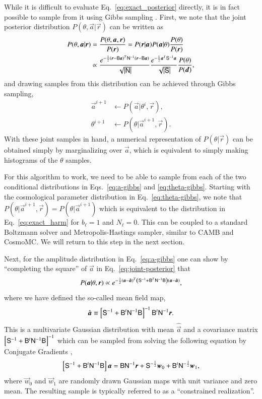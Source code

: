 \documentclass[twocolumn]{../common/aa}
\renewcommand{\d}[0]{\vec{d}}
\newcommand{\B}[0]{\tens{B}}
\renewcommand{\a}[0]{\vec{a}}
\newcommand{\N}[0]{\tens{N}}
\newcommand{\w}[0]{\vec{w}}
\renewcommand{\S}[0]{\tens{S}}
\renewcommand{\r}[0]{\vec{r}}
\begin{document}
While it is difficult to evaluate Eq.~\eqref{eq:exact_posterior} directly, it is in fact possible to sample from it using Gibbs sampling \citep{jewell2004,wandelt2004}. First, we note that the joint posterior distribution $P(\theta, \a | \r)$ can be written as
\begin{align}
    \nonumber
    P(\theta, \a | \r) &= \frac{P(\theta, \a, \r)}{P(\r)} = P(\r | \a)P(\a| \theta)\frac{P(\theta)}{P(\r)}\\
    \label{eq:joint-posterior}
    &\propto \frac{e^{-\frac12 \left(\r-\B\a \right)^T \N^{-1}\left(\r-\B\a \right)}}{\sqrt{\left|\N\right|}}
    \frac{e^{-\frac12 \a^T \S^{-1}\a}}{\sqrt{\left|\S\right|}}\frac{P(\theta)}{P(\d)},
\end{align}
and drawing samples from this distribution can be achieved through Gibbs sampling,
\begin{align}
    \label{eq:a-gibbs}
    \a^{i+1} &\leftarrow P(\a | \theta^{i}, \r),\\
    \label{eq:theta-gibbs}
    \theta^{i+1} &\leftarrow P(\theta | \a^{i+1}, \r).
\end{align}
With these joint samples in hand, a numerical representation of $P(\theta | \r)$ can be obtained simply by marginalizing over $\a$, which is equivalent to simply making histograms of the $\theta$ samples.

For this algorithm to work, we need to be able to sample from each of the two conditional distributions in Eqs.~\eqref{eq:a-gibbs} and \eqref{eq:theta-gibbs}. Starting with the cosmological parameter distribution in Eq.~\ref{eq:theta-gibbs}, we note that $P(\theta | \a^{i+1}, \r) = P(\theta | \a^{i+1})$ which is equivalent to the distribution in Eq.~\ref{eq:exact_harm} for $b_\ell=1$ and $N_\ell=0$. This can be coupled to a standard Boltzmann solver and Metropolis-Hastings sampler, similar to CAMB and CosmoMC. We will return to this step in the next section.

Next, for the amplitude distribution in Eq.~\eqref{eq:a-gibbs} one can show by ``completing the square'' of $\a$ in Eq.~\eqref{eq:joint-posterior} that 
\begin{equation}
    P(\a | \theta, \r) \propto e^{-\frac12 \left(\a - \hat{\a}\right)^T \left(\S^{-1} + \B^T\N^{-1}\B\right) \left(\a - {\hat{\a}}\right)},
\end{equation}
where we have defined the so-called mean field map,
\begin{equation}
\label{eq:mean-field-map}
\hat{\a} \equiv \left[\S^{-1} + \B^t \N^{-1}\B \right]^{-1} \B^t \N^{-1} \r.
\end{equation}
This is a multivariate Gaussian distribution with mean $\hat{\a}$ and a covariance matrix $\left[\S^{-1} + \B^t \N^{-1}\B \right]^{-1}$ which can be sampled from solving the following equation by Conjugate Gradients \citep{shewchuk:1994,seljebotn:2019},
\begin{equation}
    \label{eq:mapmakingeq}
    \left[\S^{-1} + \B^t \N^{-1}\B \right]\a = \B \N^{-1} \r + \S^{-\frac{1}{2}}\w_0 +\B^t \N^{-\frac{1}{2}}\w_1,
\end{equation}
where $\w_0$ and $\w_1$ are randomly drawn Gaussian maps with unit variance and zero mean. The resulting sample is typically referred to as a ``constrained realization''.
\end{document}
